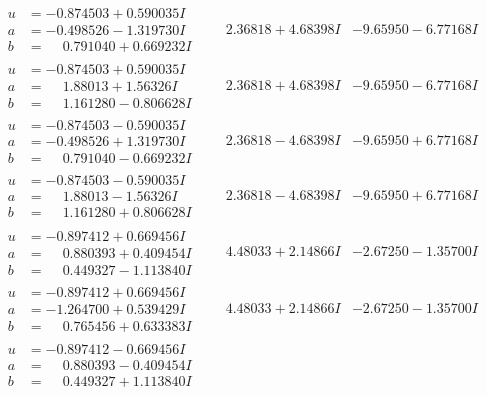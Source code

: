 \documentclass[1p]{elsarticle_modified}
\theoremstyle{definition}
\begin{document}
$$\begin{array}{c|c|c}
\begin{aligned}
u &= -0.874503 + 0.590035 I \\
a &= -0.498526 - 1.319730 I \\
b &= \phantom{-}0.791040 + 0.669232 I\end{aligned}
 & \phantom{-}2.36818 + 4.68398 I & -9.65950 - 6.77168 I \\ \hline\begin{aligned}
u &= -0.874503 + 0.590035 I \\
a &= \phantom{-}1.88013 + 1.56326 I \\
b &= \phantom{-}1.161280 - 0.806628 I\end{aligned}
 & \phantom{-}2.36818 + 4.68398 I & -9.65950 - 6.77168 I \\ \hline\begin{aligned}
u &= -0.874503 - 0.590035 I \\
a &= -0.498526 + 1.319730 I \\
b &= \phantom{-}0.791040 - 0.669232 I\end{aligned}
 & \phantom{-}2.36818 - 4.68398 I & -9.65950 + 6.77168 I \\ \hline\begin{aligned}
u &= -0.874503 - 0.590035 I \\
a &= \phantom{-}1.88013 - 1.56326 I \\
b &= \phantom{-}1.161280 + 0.806628 I\end{aligned}
 & \phantom{-}2.36818 - 4.68398 I & -9.65950 + 6.77168 I \\ \hline\begin{aligned}
u &= -0.897412 + 0.669456 I \\
a &= \phantom{-}0.880393 + 0.409454 I \\
b &= \phantom{-}0.449327 - 1.113840 I\end{aligned}
 & \phantom{-}4.48033 + 2.14866 I & -2.67250 - 1.35700 I \\ \hline\begin{aligned}
u &= -0.897412 + 0.669456 I \\
a &= -1.264700 + 0.539429 I \\
b &= \phantom{-}0.765456 + 0.633383 I\end{aligned}
 & \phantom{-}4.48033 + 2.14866 I & -2.67250 - 1.35700 I \\ \hline\begin{aligned}
u &= -0.897412 - 0.669456 I \\
a &= \phantom{-}0.880393 - 0.409454 I \\
b &= \phantom{-}0.449327 + 1.113840 I\end{aligned}

\end{array}$$
\end{document}
